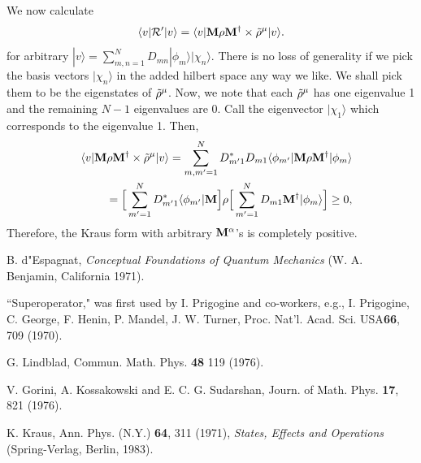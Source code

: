 \documentclass[aps,pra,amssymb, amsfonts,amsmath,showpacs, superscriptaddress,12pt]{revtex4}
\begin{document}
\begin{appendix}
We now calculate
\begin{equation}\label{B2}
\langle v|{\cal R}'|v\rangle=\langle v|{\bf M}{\bf\rho}{\bf M}^{\dagger}\times\tilde{\bf\rho}^{\mu}|v\rangle.
\end{equation}
\noindent for arbitrary $|v\rangle=\sum_{m,n=1}^{N}D_{mn}|\phi_{m}\rangle|\chi_{n}\rangle$.  There is no loss of generality if we pick the basis vectors  $|\chi_{n}\rangle$ in the added hilbert space any way we like.  We shall pick them  to be the eigenstates of  
$\tilde{\bf\rho}^{\mu}$. Now, we note that each $\tilde{\bf\rho}^{\mu}$ has one eigenvalue 1 and the remaining $N-1$ eigenvalues are 0.  
 Call the eigenvector  $|\chi_{1}\rangle$ which corresponds to the eigenvalue 1.  Then, 
\begin{eqnarray}\label{B3}
&&\langle v|{\bf M}{\bf \rho}{\bf M}^{\dagger}\times\tilde{\bf\rho}^{\mu}|v\rangle=\sum_{m,m' =1}^{N}
D_{m'1}^{*}D_{m1}\langle \phi_{m'}|{\bf M}{\bf \rho}{\bf M}^{\dagger}|\phi_{m}\rangle\nonumber\\
&&=\Big[\sum_{m' =1}^{N}D_{m'1}^{*}\langle \phi_{m'}|{\bf M}\Big]{\bf\rho}
\Big[\sum_{m' =1}^{N}D_{m1}{\bf M}^{\dagger}| \phi_{m}\rangle\Big]\geq 0,
\end{eqnarray}
\noindent Therefore,  the Kraus form with arbitrary ${\bf M}^{\alpha}$'s is completely positive.


\end{appendix}




\begin{thebibliography}{99}

 B. d"Espagnat, \textit{Conceptual Foundations of Quantum Mechanics} (W. A. Benjamin, California 1971).

 ``Superoperator," was first used by I. Prigogine and co-workers, e.g., I. Prigogine, C. George, F. Henin, P. Mandel, J. W. Turner, Proc. Nat'l. Acad. Sci. USA{\bf 66}, 709 (1970).  

 G. Lindblad, Commun. Math. Phys. {\bf 48} 119 (1976).

 V. Gorini, A. Kossakowski and E. C. G. Sudarshan, Journ. of Math. Phys. {\bf 17}, 821 (1976). 

 K. Kraus, Ann. Phys. (N.Y.) {\bf 64}, 311 (1971), \textit{ States, Effects and Operations} (Spring-Verlag, Berlin, 1983). 


\end{thebibliography}

 
\end{document}
